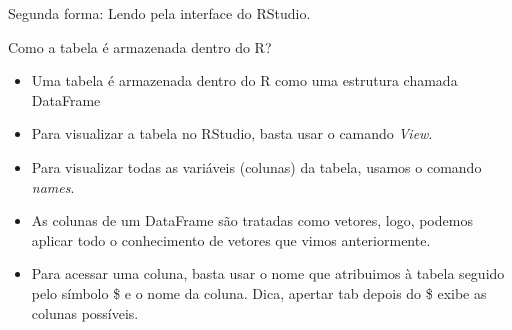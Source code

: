 \documentclass{beamer}
\begin{document}
\begin{frame}
  Segunda forma: Lendo pela interface do RStudio. 
\end{frame}

\begin{frame}{Como a tabela é armazenada dentro do R?}
  \begin{itemize}
    \item Uma tabela é armazenada dentro do R como uma estrutura chamada DataFrame
    \pause
    \item Para visualizar a tabela no RStudio, basta usar o camando \textit{View}.
    \pause
    \item Para visualizar todas as variáveis (colunas) da tabela, usamos o comando \textit{names}.
    \pause
    \item As colunas de um DataFrame são tratadas como vetores, logo, podemos aplicar todo o conhecimento de vetores que vimos anteriormente.
    \pause
    \item Para acessar uma coluna, basta usar o nome que atribuimos à tabela seguido pelo símbolo \$ e o nome da coluna. Dica, apertar tab depois do \$ exibe as colunas possíveis.
  \end{itemize}
\end{frame}






\end{document}
